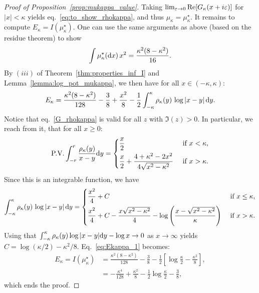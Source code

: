 \begin{proof}[Proof of Proposition~\ref{prop:mukappa_value}]
    Taking $\lim_{\varepsilon \to 0} \mathrm{Re}[G_\kappa(x+i \varepsilon)]$ for $|x| < \kappa$ yields eq.~\eqref{eq:to_show_rhokappa}, and thus $\mu_\kappa = \mu_\kappa^\star$. 
    It remains to compute $E_\kappa = I(\mu_\kappa^\star)$.
    One can use the same arguments as above (based on the residue theorem) to show 
    \begin{equation}
        \label{eq:int_mukappa_x2}
        \int \mu_\kappa^\star(\mathrm{d} x) \, x^2 = \frac{\kappa^2(8-\kappa^2)}{16}. 
    \end{equation}
    By $(iii)$ of Theorem~\ref{thm:properties_inf_I} and Lemma~\ref{lemma:log_pot_mukappa},
    we then have for all $x \in (-\kappa,\kappa)$:
    \begin{equation}
        \label{eq:Ekappa_1}
        E_\kappa = \frac{\kappa^2(8-\kappa^2)}{128} - \frac{3}{8} + \frac{x^2}{8} - \frac{1}{2} \int_{-\kappa}^\kappa \rho_\kappa(y) \, \log |x-y| \, \mathrm{d} y.  
    \end{equation}
    Notice that eq.~\eqref{G_rhokappa} is valid for all $z$ with $\Im(z) > 0$. In particular, we reach from it, that for all $x \geq 0$:
    \begin{equation*}
        \textrm{P.V.}\int_{-r}^r \frac{\rho_\kappa(y)}{x-y} \mathrm{d} y =
        \begin{dcases}
            \frac{x}{2} & \textrm{ if } x < \kappa, \\ 
            \frac{x}{2} + \frac{4+\kappa^2-2x^2}{4\sqrt{x^2-\kappa^2}} & \textrm{ if } x > \kappa.
        \end{dcases}
    \end{equation*}
    Since this is an integrable function, we have
    \begin{equation*}
        \int_{-\kappa}^\kappa \rho_\kappa(y) \, \log |x-y| \, \mathrm{d} y =
        \begin{dcases}
            \frac{x^2}{4} + C & \textrm{ if } x \leq \kappa, \\ 
            \frac{x^2}{4} + C - \frac{x\sqrt{x^2-\kappa^2}}{4} - \log\left(\frac{x-\sqrt{x^2-\kappa^2}}{\kappa}\right) & \textrm{ if } x > \kappa.
        \end{dcases}
    \end{equation*}
    Using that $\int_{-\kappa}^\kappa \rho_\kappa(y) \log |x-y| \mathrm{d} y - \log x \to 0$ as $x \to \infty$ yields $C = \log(\kappa/2) - \kappa^2/8$.
    Eq.~\eqref{eq:Ekappa_1} becomes:
    \begin{align*}
        E_\kappa = I(\mu_\kappa^\star) &= \frac{\kappa^2(8-\kappa^2)}{128} - \frac{3}{8}  - \frac{1}{2} \left[\log \frac{\kappa}{2} - \frac{\kappa^2}{8}\right], \\ 
        &= - \frac{\kappa^4}{128} + \frac{\kappa^2}{8} - \frac{1}{2} \log \frac{\kappa}{2} - \frac{3}{8},
    \end{align*}
    which ends the proof.
\end{proof}
